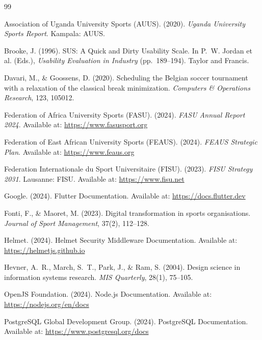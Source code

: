 \documentclass[12pt,a4paper]{report}
\begin{document}
\newpage
\begin{thebibliography}{99}

Association of Uganda University Sports (AUUS). (2020). \textit{Uganda University Sports Report}. Kampala: AUUS.

Brooke, J. (1996). SUS: A Quick and Dirty Usability Scale. In P.~W. Jordan et al. (Eds.), \textit{Usability Evaluation in Industry} (pp.~189--194). Taylor and Francis.

Davari, M., \& Goossens, D. (2020). Scheduling the Belgian soccer tournament with a relaxation of the classical break minimization. \textit{Computers \& Operations Research}, 123, 105012.

Federation of Africa University Sports (FASU). (2024). \textit{FASU Annual Report 2024}. Available at: \url{https://www.fasusport.org}

Federation of East African University Sports (FEAUS). (2024). \textit{FEAUS Strategic Plan}. Available at: \url{https://www.feaus.org}

Federation Internationale du Sport Universitaire (FISU). (2023). \textit{FISU Strategy 2031}. Lausanne: FISU. Available at: \url{https://www.fisu.net}

Google. (2024). Flutter Documentation. Available at: \url{https://docs.flutter.dev}

Fonti, F., \& Maoret, M. (2023). Digital transformation in sports organisations. \textit{Journal of Sport Management}, 37(2), 112--128.

Helmet. (2024). Helmet Security Middleware Documentation. Available at: \url{https://helmetjs.github.io}

Hevner, A.~R., March, S.~T., Park, J., \& Ram, S. (2004). Design science in information systems research. \textit{MIS Quarterly}, 28(1), 75--105.

OpenJS Foundation. (2024). Node.js Documentation. Available at: \url{https://nodejs.org/en/docs}

PostgreSQL Global Development Group. (2024). PostgreSQL Documentation. Available at: \url{https://www.postgresql.org/docs}


\end{thebibliography}
\end{document}
